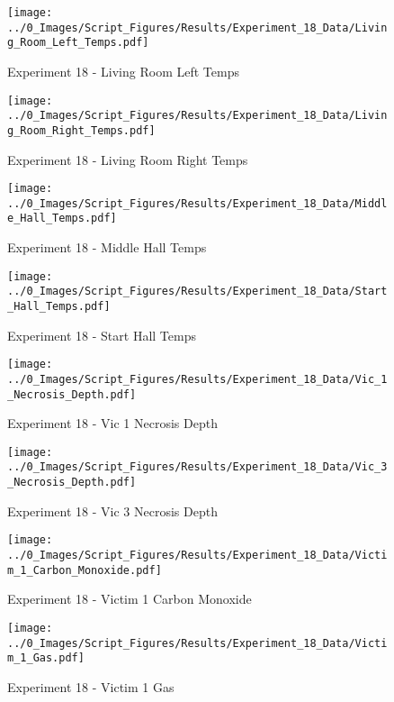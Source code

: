 	\begin{figure}[H]
		\centering
		\texttt{[image: ../0\_Images/Script\_Figures/Results/Experiment\_18\_Data/Living\_Room\_Left\_Temps.pdf]}
		\caption[]{Experiment 18 - Living Room Left Temps}
	\end{figure}
 
	\clearpage

	\begin{figure}[H]
		\centering
		\texttt{[image: ../0\_Images/Script\_Figures/Results/Experiment\_18\_Data/Living\_Room\_Right\_Temps.pdf]}
		\caption[]{Experiment 18 - Living Room Right Temps}
	\end{figure}
 

	\begin{figure}[H]
		\centering
		\texttt{[image: ../0\_Images/Script\_Figures/Results/Experiment\_18\_Data/Middle\_Hall\_Temps.pdf]}
		\caption[]{Experiment 18 - Middle Hall Temps}
	\end{figure}
 
	\clearpage

	\begin{figure}[H]
		\centering
		\texttt{[image: ../0\_Images/Script\_Figures/Results/Experiment\_18\_Data/Start\_Hall\_Temps.pdf]}
		\caption[]{Experiment 18 - Start Hall Temps}
	\end{figure}
 

	\begin{figure}[H]
		\centering
		\texttt{[image: ../0\_Images/Script\_Figures/Results/Experiment\_18\_Data/Vic\_1\_Necrosis\_Depth.pdf]}
		\caption[]{Experiment 18 - Vic 1 Necrosis Depth}
	\end{figure}
 
	\clearpage

	\begin{figure}[H]
		\centering
		\texttt{[image: ../0\_Images/Script\_Figures/Results/Experiment\_18\_Data/Vic\_3\_Necrosis\_Depth.pdf]}
		\caption[]{Experiment 18 - Vic 3 Necrosis Depth}
	\end{figure}
 

	\begin{figure}[H]
		\centering
		\texttt{[image: ../0\_Images/Script\_Figures/Results/Experiment\_18\_Data/Victim\_1\_Carbon\_Monoxide.pdf]}
		\caption[]{Experiment 18 - Victim 1 Carbon Monoxide}
	\end{figure}
 
	\clearpage

	\begin{figure}[H]
		\centering
		\texttt{[image: ../0\_Images/Script\_Figures/Results/Experiment\_18\_Data/Victim\_1\_Gas.pdf]}
		\caption[]{Experiment 18 - Victim 1 Gas}
	\end{figure}
 

